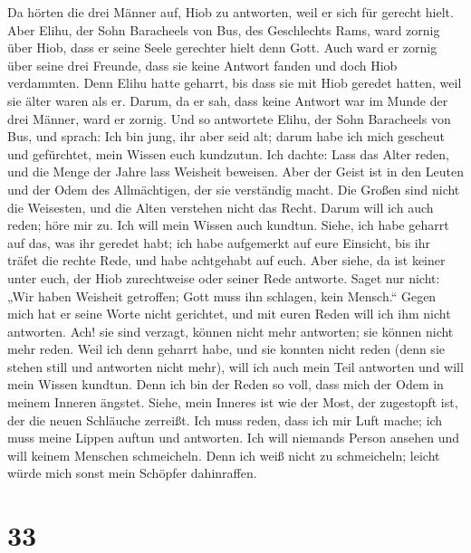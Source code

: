  Da hörten die drei Männer auf, Hiob zu antworten, weil er
sich für gerecht hielt.  Aber Elihu, der Sohn Baracheels
von Bus, des Geschlechts Rams, ward zornig über Hiob, dass er seine
Seele gerechter hielt denn Gott.  Auch ward er zornig über
seine drei Freunde, dass sie keine Antwort fanden und doch Hiob
verdammten.  Denn Elihu hatte geharrt, bis dass sie mit
Hiob geredet hatten, weil sie älter waren als er.  Darum,
da er sah, dass keine Antwort war im Munde der drei Männer, ward er
zornig.  Und so antwortete Elihu, der Sohn Baracheels von
Bus, und sprach: Ich bin jung, ihr aber seid alt; darum habe ich mich
gescheut und gefürchtet, mein Wissen euch kundzutun.  Ich
dachte: Lass das Alter reden, und die Menge der Jahre lass Weisheit
beweisen.  Aber der Geist ist in den Leuten und der Odem
des Allmächtigen, der sie verständig macht.  Die Großen
sind nicht die Weisesten, und die Alten verstehen nicht das Recht.
 Darum will ich auch reden; höre mir zu. Ich will mein
Wissen auch kundtun.  Siehe, ich habe geharrt auf das,
was ihr geredet habt; ich habe aufgemerkt auf eure Einsicht, bis ihr
träfet die rechte Rede,  und habe achtgehabt auf euch.
Aber siehe, da ist keiner unter euch, der Hiob zurechtweise oder seiner
Rede antworte.  Saget nur nicht: „Wir haben Weisheit
getroffen; Gott muss ihn schlagen, kein Mensch.``  Gegen
mich hat er seine Worte nicht gerichtet, und mit euren Reden will ich
ihm nicht antworten.  Ach! sie sind verzagt, können nicht
mehr antworten; sie können nicht mehr reden.  Weil ich
denn geharrt habe, und sie konnten nicht reden (denn sie stehen still
und antworten nicht mehr),  will ich auch mein Teil
antworten und will mein Wissen kundtun.  Denn ich bin der
Reden so voll, dass mich der Odem in meinem Inneren ängstet.
 Siehe, mein Inneres ist wie der Most, der zugestopft
ist, der die neuen Schläuche zerreißt.  Ich muss reden,
dass ich mir Luft mache; ich muss meine Lippen auftun und antworten.
 Ich will niemands Person ansehen und will keinem
Menschen schmeicheln.  Denn ich weiß nicht zu
schmeicheln; leicht würde mich sonst mein Schöpfer dahinraffen.

\hypertarget{section-32}{%
\section{33}\label{section-32}}


